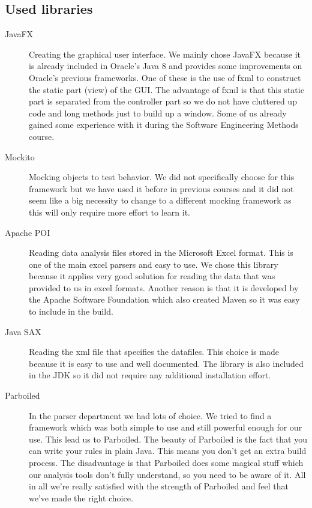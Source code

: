 \documentclass[a4paper]{article}
\begin{document}
\subsection{Used libraries}
\begin{description}

\item[JavaFX] Creating the graphical user interface. We mainly chose JavaFX because it is already included in Oracle's Java 8 and provides some
improvements on Oracle's previous frameworks. One of these is the use of fxml to
construct the static part (view) of the GUI. The advantage of fxml is that this static part is separated from the controller part so we do not have cluttered up code and long methods just to build up a window. Some of us already gained some
experience with it during the Software Engineering Methods course.

\item[Mockito] Mocking objects to test behavior. We did not specifically choose
for this framework but we have used it before in previous courses and it did not
seem like a big necessity to change to a different mocking framework as this
will only require more effort to learn it.

\item[Apache POI] Reading data analysis files stored in the Microsoft Excel
format. This is one of the main excel parsers and easy to use. We chose this
library because it applies very good solution for reading the data that was
provided to us in excel formats. Another reason is that it is developed by the 
Apache Software Foundation which also created Maven so it was easy to include in
the build.

\item[Java SAX] Reading the xml file that specifies the datafiles. This choice is
made because it is easy to use and well documented. The library is also included
in the JDK so it did not require any additional installation effort.

\item[Parboiled] In the parser department we had lots of choice. We tried to find a
framework which was both simple to use and still powerful enough for our use. This lead
us to Parboiled. The beauty of Parboiled is the fact that you can write your rules in
plain Java. This means you don't get an extra build process. The disadvantage is that
Parboiled does some magical stuff which our analysis tools don't fully understand, 
so you need to be aware of it. All in all we're really satisfied with the strength of
Parboiled and feel that we've made the right choice.

\end{description}
\end{document}
